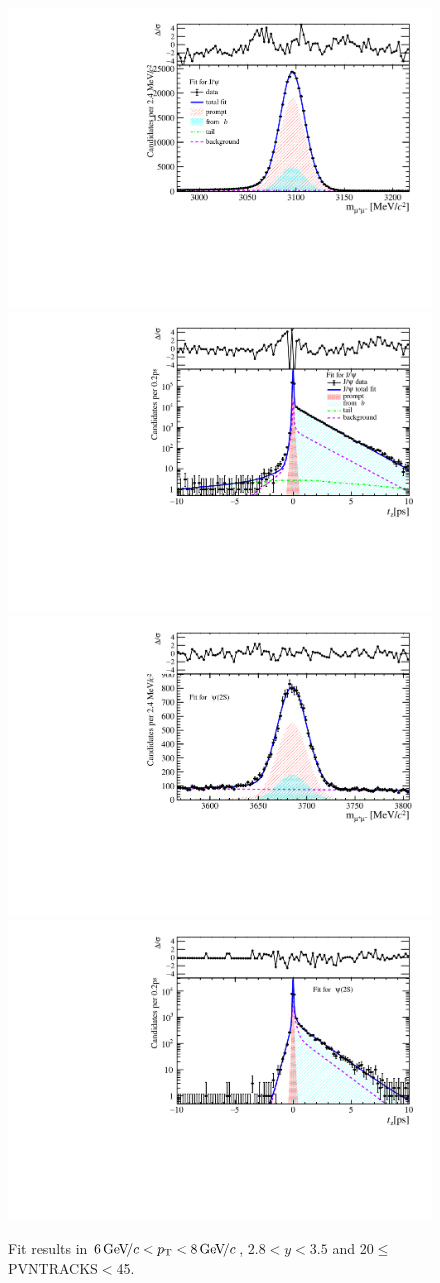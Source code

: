 \begin{figure}[H]
\begin{center}
\includegraphics[width=0.47\linewidth]{pdf/Jpsi/drawmass/n2y2pt4.pdf}
\includegraphics[width=0.47\linewidth]{pdf/Jpsi/2DFit/n2y2pt4.pdf}
\vspace*{-0.5cm}
\includegraphics[width=0.47\linewidth]{pdf/Psi2S/drawmass/n2y2pt4.pdf}
\includegraphics[width=0.47\linewidth]{pdf/Psi2S/2DFit/n2y2pt4.pdf}
\vspace*{-0.5cm}
\end{center}
\caption{Fit results in $6\text{\,Ge\kern -0.1em V\!/}c<p_{\mathrm{T}}<8\text{\,Ge\kern -0.1em V\!/}c$, $2.8<y<3.5$ and 20$\leq$PVNTRACKS$<$45.}
\label{Fitn2y2pt4}
\end{figure}
